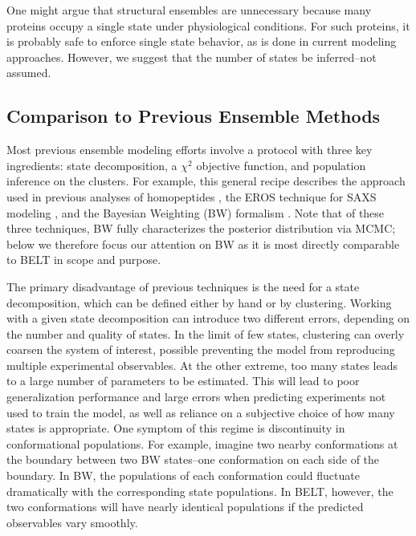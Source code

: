 \documentclass[11pt,titlepage]{article}
\begin{document}
One might argue that structural ensembles are unnecessary because many proteins occupy a single state under physiological conditions.  For such proteins, it is probably safe to enforce single state behavior, as is done in current modeling approaches. However, we suggest that the number of states be inferred--not assumed.  


\subsection*{Comparison to Previous Ensemble Methods}

Most previous ensemble modeling efforts involve a protocol with three key ingredients: state decomposition, a $\chi^2$ objective function, and population inference on the clusters.  For example, this general recipe describes the approach used in previous analyses of homopeptides  \citep{Graf2007}, the EROS technique for SAXS modeling  \citep{rozycki2011saxs}, and the Bayesian Weighting (BW) formalism  \citep{fisher2010}.  Note that of these three techniques, BW fully characterizes the posterior distribution via MCMC; below we therefore focus our attention on BW as it is most directly comparable to BELT in scope and purpose.

The primary disadvantage of previous techniques is the need for a state decomposition, which can be defined either by hand or by clustering.  Working with a given state decomposition can introduce two different errors, depending on the number  and quality of states.  In the limit of few states, clustering can overly coarsen the system of interest, possible preventing the model from reproducing multiple experimental observables.  At the other extreme, too many states leads to a large number of parameters to be estimated. This will lead to poor generalization performance and large errors when predicting experiments not used to train the model, as well as reliance on a subjective choice of how many states is appropriate.  One symptom of this regime is discontinuity in conformational populations. For example, imagine two nearby conformations at the boundary between two BW states--one conformation on each side of the boundary.  In BW, the populations of each conformation could fluctuate dramatically with the corresponding 
state populations.  In BELT, however, the two conformations will have nearly identical populations if the predicted observables vary smoothly.
\end{document}
